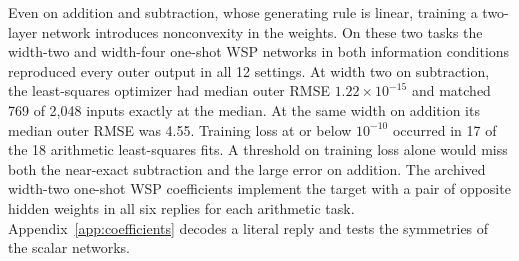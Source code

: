 Even on addition and subtraction, whose generating rule is linear, training a two-layer network introduces nonconvexity in the weights. On these two tasks the width-two and width-four one-shot WSP networks in both information conditions reproduced every outer output in all 12 settings. At width two on subtraction, the least-squares optimizer had median outer RMSE $1.22\times10^{-15}$ and matched 769 of 2,048 inputs exactly at the median. At the same width on addition its median outer RMSE was 4.55. Training loss at or below $10^{-10}$ occurred in 17 of the 18 arithmetic least-squares fits. A threshold on training loss alone would miss both the near-exact subtraction and the large error on addition. The archived width-two one-shot WSP coefficients implement the target with a pair of opposite hidden weights in all six replies for each arithmetic task. Appendix~\ref{app:coefficients} decodes a literal reply and tests the symmetries of the scalar networks.
